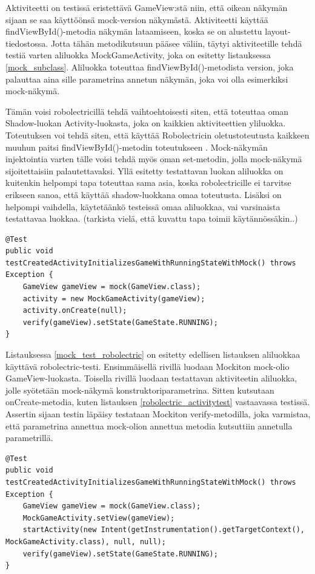 Aktiviteetti on testissä eristettävä GameView:stä niin, että oikean näkymän sijaan se saa käyttöönsä mock-version näkymästä. Aktiviteetti käyttää findViewById()-metodia näkymän lataamiseen, koska se on alustettu layout-tiedostossa. Jotta tähän metodikutsuun pääsee väliin, täytyi aktiviteetille tehdä testiä varten aliluokka MockGameActivity, joka on esitetty listauksessa \ref{mock_subclass}. Aliluokka toteuttaa findViewById()-metodista version, joka palauttaa aina sille parametrina annetun näkymän, joka voi olla esimerkiksi mock-näkymä.

Tämän voisi robolectricillä tehdä vaihtoehtoisesti siten, että toteuttaa oman Shadow-luokan Activity-luokasta, joka on kaikkien aktiviteettien yliluokka. Toteutuksen voi tehdä siten, että käyttää Robolectricin oletustoteutusta kaikkeen muuhun paitsi findViewById()-metodin toteutukseen \cite{robolectric}. Mock-näkymän injektointia varten tälle voisi tehdä myös oman set-metodin, jolla mock-näkymä sijoitettaisiin palautettavaksi. Yllä esitetty testattavan luokan aliluokka on kuitenkin helpompi tapa toteuttaa sama asia, koska robolectricille ei tarvitse erikseen sanoa, että käyttää shadow-luokkana omaa toteutusta. Lisäksi on helpompi vaihdella, käytetäänkö testeissä omaa aliluokkaa, vai varsinaista testattavaa luokkaa. (tarkista vielä, että kuvattu tapa toimii käytännössäkin..)

\begin{lstlisting}[float,label=mock_test_robolectric, caption=Mock-testi robolectrcicillä]
@Test
public void testCreatedActivityInitializesGameWithRunningStateWithMock() throws Exception {
	GameView gameView = mock(GameView.class);
	activity = new MockGameActivity(gameView);
	activity.onCreate(null);
	verify(gameView).setState(GameState.RUNNING);
}
\end{lstlisting}

Listauksessa \ref{mock_test_robolectric} on esitetty edellisen listauksen aliluokkaa käyttävä robolectric-testi. Ensimmäisellä rivillä luodaan Mockiton mock-olio GameView-luokasta. Toisella rivillä luodaan testattavan aktiviteetin aliluokka, jolle syötetään mock-näkymä konstruktoriparametrina. Sitten kutsutaan onCreate-metodia, kuten listauksen \ref{robolectric_activitytest} vastaavassa testissä. Assertin sijaan testin läpäisy testataan Mockiton verify-metodilla, joka varmistaa, että parametrina annettua mock-olion annettua metodia kutsuttiin annetulla parametrillä.

\begin{lstlisting}[float,label=mock_test_android, caption=Mock-testi androidunittestillä]
@Test
public void testCreatedActivityInitializesGameWithRunningStateWithMock() throws Exception {
	GameView gameView = mock(GameView.class);
	MockGameActivity.setView(gameView);
	startActivity(new Intent(getInstrumentation().getTargetContext(), MockGameActivity.class), null, null);
	verify(gameView).setState(GameState.RUNNING);
}
\end{lstlisting}

